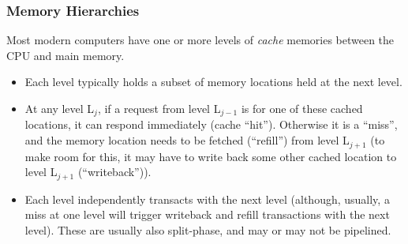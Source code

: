 \begin{frame}[fragile]
\frametitle{Memory Hierarchies}

\footnotesize

Most modern computers have one or more levels of \emph{cache} memories
between the CPU and main memory.

\vspace{1ex}

\begin{center}
\end{center}

\begin{itemize}

 \item Each level typically holds a subset of memory locations held at
       the next level.

 \PAUSE{}

 \item At any level L$_j$, if a request from level L$_{j-1}$ is for
       one of these cached locations, it can respond immediately
       (cache ``hit'').  Otherwise it is a ``miss'', and the memory
       location needs to be fetched (``refill'') from level L$_{j+1}$
       (to make room for this, it may have to write back some other
       cached location to level L$_{j+1}$ (``writeback'')).

 \PAUSE{}

 \item Each level independently transacts with the next level
       (although, usually, a miss at one level will trigger writeback
       and refill transactions with the next level).  These are
       usually also split-phase, and may or may not be pipelined.

\end{itemize}

\end{frame}






